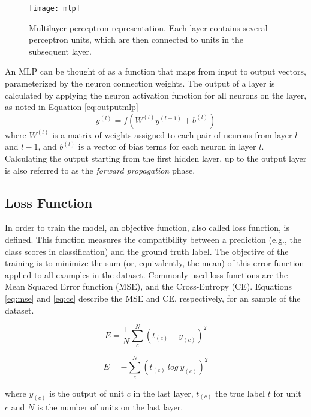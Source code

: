 \begin{figure}[!htb]
\centering
\texttt{[image: mlp]}
\caption{Multilayer perceptron representation. Each layer contains several perceptron units, which are then connected to units in the subsequent layer.}
\label{mlp}
\end{figure}

An MLP can be thought of as a function that maps from input to output vectors, parameterized by the neuron connection weights. The output of a layer
is calculated by applying the neuron activation function for all neurons on the layer, as
noted in Equation \ref{eq:outputmlp}
\begin{equation}
y^{(l)} = f(W^{(l)} y^{(l-1)} + b^{(l)})
\label{eq:outputmlp}
\end{equation}
where $W^{(l)}$ is a matrix of weights assigned to each pair of neurons from layer $l$ and $l-1$, and $b^{(l)}$ is a vector of bias terms for each neuron in layer $l$. Calculating the output starting from the first hidden layer, up to the output layer is also referred to as the \textit{forward propagation} phase.

\subsection{Loss Function}
In order to train the model, an objective function, also called loss function, is defined.
This function measures the compatibility between a prediction (e.g., the class scores in classification) and the ground truth label. The
objective of the training is to minimize the sum (or, equivalently, the mean) of
this error function applied to all examples in the dataset. Commonly used loss functions
are the Mean Squared Error function (MSE), and the Cross-Entropy (CE). Equations \ref{eq:mse} and \ref{eq:ce} describe the MSE and CE, respectively, for an sample of the dataset.

\begin{equation}
E =  \frac{1}{N} \sum_{c}^{N} (t_{(c)} - y^{}_{(c)} )^2 
\label{eq:mse}
\end{equation}

\begin{equation}
E = - \sum_{c}^{N} (t_{(c)} \: log \: y^{}_{(c)} )^2 
\label{eq:ce}
\end{equation}

where $y^{}_{(c)}$ is the output of unit $c$ in the last layer, $t_{(c)}$
the true label $t$ for unit $c$ and $N$ is the number of units on the last layer.
